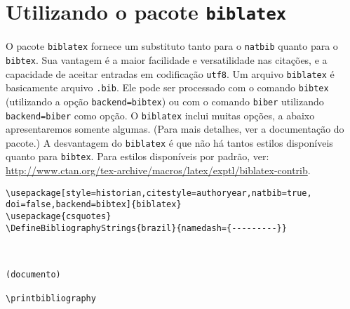 \section{Utilizando o pacote \texttt{biblatex}}


O pacote \texttt{biblatex} fornece um substituto tanto para o \texttt{natbib} quanto para o \texttt{bibtex}. Sua vantagem é a maior facilidade e versatilidade nas citações, e a capacidade de aceitar entradas em codificação \texttt{utf8}. Um arquivo \texttt{biblatex} é basicamente arquivo \texttt{.bib}. Ele pode ser processado com o comando \texttt{bibtex} (utilizando a opção \texttt{backend=bibtex}) ou com o comando \texttt{biber} utilizando \texttt{backend=biber} como opção. O \texttt{biblatex} inclui muitas opções, a abaixo apresentaremos somente algumas. (Para mais detalhes, ver a documentação do pacote.) A desvantagem do \texttt{biblatex} é que não há tantos estilos disponíveis quanto para \texttt{bibtex}. Para estilos disponíveis por padrão, ver: \url{http://www.ctan.org/tex-archive/macros/latex/exptl/biblatex-contrib}.


\begin{verbatim}
\usepackage[style=historian,citestyle=authoryear,natbib=true,
doi=false,backend=bibtex]{biblatex}
\usepackage{csquotes}
\DefineBibliographyStrings{brazil}{namedash={---------}}



(documento)

\printbibliography



\end{verbatim}


